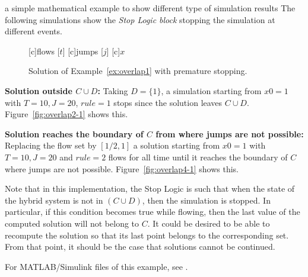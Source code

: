 \begin{example}{a simple mathematical example to show different type of simulation results}
The following simulations show the {\em Stop Logic block} stopping
the simulation at different events.
\begin{figure}[ht]
  \centering
  [c]{flows [$t$]}
  [c]{jumps [$j$]}
  [c]{$x$}
\qquad
{}
\caption{Solution of Example~\ref{ex:overlap1} with premature stopping.}
\end{figure}

{\bf Solution outside $C\cup D$:}
Taking $D = \{1\}$, a simulation starting from $x0=1$ with $T=10,J=20$, $rule = 1$ stops since the solution leaves $C\cup D$. Figure~\ref{fig:overlap2-1} shows this.

{\bf Solution reaches the boundary of $C$ from where jumps are not possible:}
Replacing the flow set by  $[1/2,1]$
a solution starting from $x0=1$ with $T=10,J=20$ and $rule = 2$
flows for all time until it reaches the boundary of
$C$ where jumps are not possible. Figure~\ref{fig:overlap4-1}
shows this.

Note that in this implementation, the Stop Logic is such that when the
state of the hybrid system is not in $(C \cup D)$, then the
simulation is stopped. In particular, if this condition becomes true
while flowing, then the last value of the computed solution will not
belong to $C$. It
could be desired to be able to recompute the solution so that its last
point belongs to the corresponding set. From that point, it should be
the case that solutions cannot be continued.

For MATLAB/Simulink files of this example, see .

\end{example}



